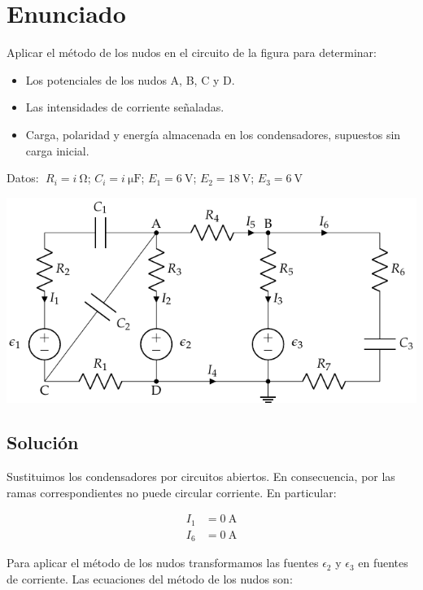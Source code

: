 
\section{Enunciado}
Aplicar el método de los nudos en el circuito de la figura para
determinar:
\begin{itemize}
\item Los potenciales de los nudos A, B, C y D.
\item Las intensidades de corriente señaladas.
\item Carga, polaridad y energía almacenada en los condensadores,
  supuestos sin carga inicial.
\end{itemize}
Datos:
$ \; R_i = \qty[parse-numbers=false]{i}{\ohm}$; \; $C_i = \qty[parse-numbers=false]{i}{\micro\farad}$; \; $E_1 = \qty{6}{\volt}$; \; $E_2 =
\qty{18}{\volt}$; \; $E_3 = \qty{6}{\volt}$

\begin{center}
  \includegraphics[]{figuras/nudos_condensadores.pdf}
\end{center}

\subsection*{Solución}

Sustituimos los condensadores por circuitos abiertos. En consecuencia, por las ramas correspondientes no puede circular corriente. En particular:

\begin{align*}
  I_1 &= \qty{0}{\ampere}\\
  I_6 &= \qty{0}{\ampere}
\end{align*}

Para aplicar el método de los nudos transformamos las fuentes $\epsilon_2$ y $\epsilon_3$ en fuentes de corriente. Las ecuaciones del método de los nudos son:

